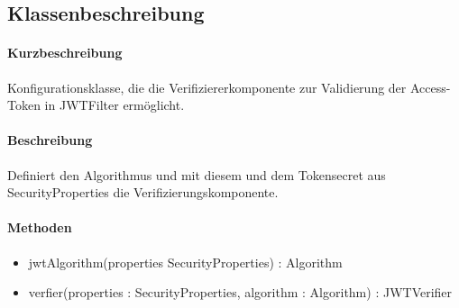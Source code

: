 \subsection{Klassenbeschreibung}%
\paragraph*{Kurzbeschreibung}
Konfigurationsklasse, die die Verifiziererkomponente zur Validierung der Access-Token in JWTFilter ermöglicht.
\paragraph*{Beschreibung}
Definiert den Algorithmus und mit diesem und dem Tokensecret aus \dq SecurityProperties \dq die Verifizierungskomponente.
\paragraph*{Methoden}
\begin{itemize}
	\item jwtAlgorithm(properties SecurityProperties) : Algorithm
    \item verfier(properties : SecurityProperties, algorithm : Algorithm) : JWTVerifier
\end{itemize}	
